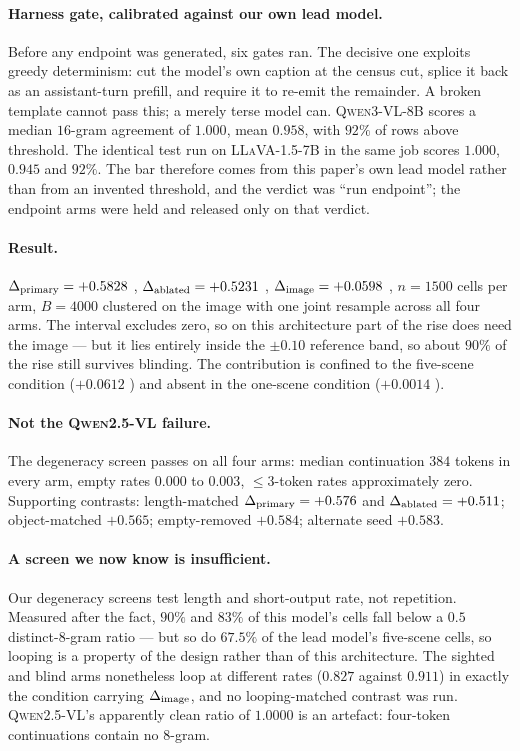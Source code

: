 \paragraph{Harness gate, calibrated against our own lead model.} Before any endpoint was generated,
six gates ran. The decisive one exploits greedy determinism: cut the model's own caption at the
census cut, splice it back as an assistant-turn prefill, and require it to re-emit the remainder. A
broken template cannot pass this; a merely terse model can. \textsc{Qwen3-VL-8B} scores a median
$16$-gram agreement of $1.000$, mean $0.958$, with $92\%$ of rows above threshold. The identical test
run on \textsc{LLaVA-1.5-7B} in the same job scores $1.000$, $0.945$ and $92\%$. The bar therefore
comes from this paper's own lead model rather than from an invented threshold, and the verdict was
``run endpoint''; the endpoint arms were held and released only on that verdict.

\paragraph{Result.} $\Delta_{\mathrm{primary}} = +0.5828$ , $\Delta_{\mathrm{ablated}} = +0.5231$
, $\Delta_{\mathrm{image}} = +0.0598$ , $n = 1500$ cells per arm,
$B = 4000$ clustered on the image with one joint resample across all four arms. The interval
excludes zero, so on this architecture part of the rise does need the image --- but it lies entirely
inside the $\pm 0.10$ reference band, so about $90\%$ of the rise still survives blinding. The
contribution is confined to the five-scene condition ($+0.0612$ ) and absent in
the one-scene condition ($+0.0014$ ).

\paragraph{Not the \textsc{Qwen2.5-VL} failure.} The degeneracy screen passes on all four arms:
median continuation $384$ tokens in every arm, empty rates $0.000$ to $0.003$, $\le 3$-token rates
approximately zero. Supporting contrasts: length-matched $\Delta_{\mathrm{primary}} = +0.576$ and $\Delta_{\mathrm{ablated}} = +0.511$;
object-matched $+0.565$; empty-removed $+0.584$; alternate seed $+0.583$.

\paragraph{A screen we now know is insufficient.} Our degeneracy screens test length and short-output
rate, not repetition. Measured after the fact, $90\%$ and $83\%$ of this model's cells fall below a
$0.5$ distinct-$8$-gram ratio --- but so do $67.5\%$ of the lead model's five-scene cells, so looping
is a property of the design rather than of this architecture. The sighted and blind arms nonetheless
loop at different rates ($0.827$ against $0.911$) in exactly the condition carrying $\Delta_{\mathrm{image}}$, and no
looping-matched contrast was run. \textsc{Qwen2.5-VL}'s apparently clean ratio of $1.0000$ is an
artefact: four-token continuations contain no $8$-gram.

